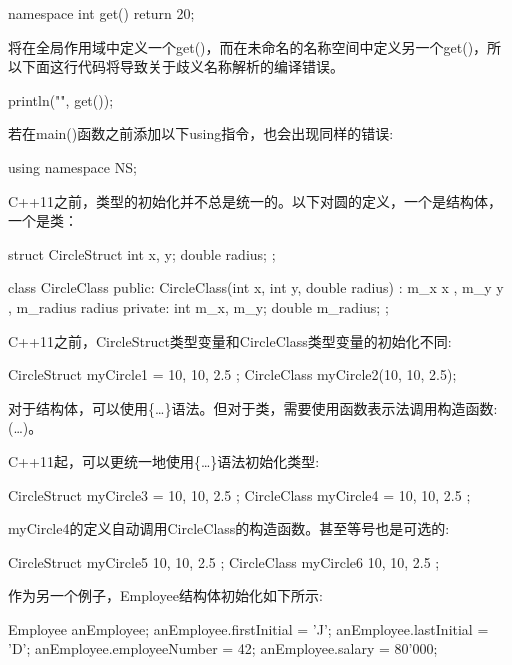 \begin{cpp}
namespace
{
    int get() { return 20; }
}
\end{cpp}

将在全局作用域中定义一个get()，而在未命名的名称空间中定义另一个get()，所以下面这行代码将导致关于歧义名称解析的编译错误。

\begin{cpp}
println("{}", get());
\end{cpp}

若在main()函数之前添加以下using指令，也会出现同样的错误:

\begin{cpp}
using namespace NS;
\end{cpp}


C++11之前，类型的初始化并不总是统一的。以下对圆的定义，一个是结构体，一个是类：

\begin{cpp}
struct CircleStruct
{
    int x, y;
    double radius;
};

class CircleClass
{
    public:
        CircleClass(int x, int y, double radius)
            : m_x { x }, m_y { y }, m_radius { radius } {}
    private:
        int m_x, m_y;
        double m_radius;
};
\end{cpp}

C++11之前，CircleStruct类型变量和CircleClass类型变量的初始化不同:

\begin{cpp}
CircleStruct myCircle1 = { 10, 10, 2.5 };
CircleClass myCircle2(10, 10, 2.5);
\end{cpp}

对于结构体，可以使用\{…\}语法。但对于类，需要使用函数表示法调用构造函数:(…)。

C++11起，可以更统一地使用\{…\}语法初始化类型:

\begin{cpp}
CircleStruct myCircle3 = { 10, 10, 2.5 };
CircleClass myCircle4 = { 10, 10, 2.5 };
\end{cpp}

myCircle4的定义自动调用CircleClass的构造函数。甚至等号也是可选的:

\begin{cpp}
CircleStruct myCircle5 { 10, 10, 2.5 };
CircleClass myCircle6 { 10, 10, 2.5 };
\end{cpp}

作为另一个例子，Employee结构体初始化如下所示:

\begin{cpp}
Employee anEmployee;
anEmployee.firstInitial = 'J';
anEmployee.lastInitial = 'D';
anEmployee.employeeNumber = 42;
anEmployee.salary = 80'000;
\end{cpp}

